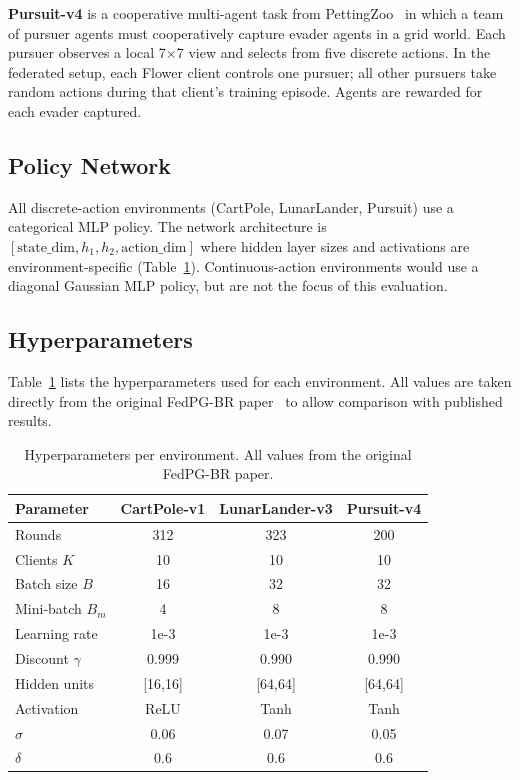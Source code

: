 \documentclass[a4paper, oneside]{discothesis}
\begin{document}
\textbf{Pursuit-v4} is a cooperative multi-agent task from PettingZoo~\cite{PettingZoo} in which a team of pursuer agents must cooperatively capture evader agents in a grid world. Each pursuer observes a local 7$\times$7 view and selects from five discrete actions. In the federated setup, each Flower client controls one pursuer; all other pursuers take random actions during that client's training episode. Agents are rewarded for each evader captured.

\subsection{Policy Network}

All discrete-action environments (CartPole, LunarLander, Pursuit) use a categorical MLP policy. The network architecture is $[\text{state\_dim}, h_1, h_2, \text{action\_dim}]$ where hidden layer sizes and activations are environment-specific (Table~\ref{tab:hparams}). Continuous-action environments would use a diagonal Gaussian MLP policy, but are not the focus of this evaluation.

\subsection{Hyperparameters}

Table~\ref{tab:hparams} lists the hyperparameters used for each environment. All values are taken directly from the original FedPG-BR paper~\cite{FedPGBR} to allow comparison with published results.

\begin{table}[h]
\centering
\caption{Hyperparameters per environment. All values from the original FedPG-BR paper.}
\label{tab:hparams}
\begin{tabular}{lccc}
\hline
\textbf{Parameter} & \textbf{CartPole-v1} & \textbf{LunarLander-v3} & \textbf{Pursuit-v4} \\
\hline
Rounds              & 312   & 323   & 200   \\
Clients $K$         & 10    & 10    & 10    \\
Batch size $B$      & 16    & 32    & 32    \\
Mini-batch $B_m$    & 4     & 8     & 8     \\
Learning rate       & 1e-3  & 1e-3  & 1e-3  \\
Discount $\gamma$   & 0.999 & 0.990 & 0.990 \\
Hidden units        & [16,16] & [64,64] & [64,64] \\
Activation          & ReLU  & Tanh  & Tanh  \\
$\sigma$            & 0.06  & 0.07  & 0.05  \\
$\delta$            & 0.6   & 0.6   & 0.6   \\
\hline
\end{tabular}
\end{table}
\end{document}
